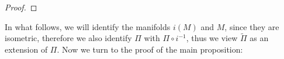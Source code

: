 \documentclass[10pt,a4paper]{article}
\theoremstyle{plain}
\theoremstyle{remark}
\theoremstyle{definition}
\theoremstyle{plain}
\theoremstyle{remark}
\theoremstyle{definition}
\newcommand{\CH}{\mathcal{CH}_{i^+}}
\newcommand{\CHone}{\mathcal{CH}_{i^+_1}}
\newcommand{\CHtwo}{\mathcal{CH}_{i^+_2}}
\numberwithin{equation}{section}
\begin{document}
\begin{proof}
 
 
 
 



\end{proof} 
 
In what follows, we will identify the manifolds $i(M)$ and $M$, since they are isometric, therefore we also identify $\Pi$ with $\Pi \circ i^{-1}$, thus we view $\tilde{\Pi}$ as an extension of $\Pi$. \color{black}Now we turn to the proof of the main proposition:
\end{document}
